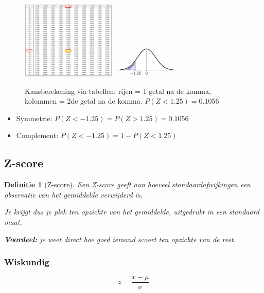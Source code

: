\documentclass{article}
\newtheorem{theorem}{Definitie}[section]
\begin{document}
\begin{figure}[H]
    \centering
    \includegraphics[width=0.4\textwidth]{normaalverdeling-tabel.png}
    \includegraphics[width=0.3\textwidth]{normaalverdeling-tabel2.png}
    \caption{Kansberekening via tabellen: rijen = 1 getal na de komma, kolommen = 2de getal na de komma. $P(Z < 1.25) = 0.1056$}
\end{figure}

\begin{itemize}
    \item Symmetrie: $P(Z < -1.25) = P(Z > 1.25) = 0.1056$
    \item Complement: $P(Z < -1.25) = 1- P(Z < 1.25)$
\end{itemize}

\subsection{Z-score}

\begin{theorem}[Z-score]
    Een Z-score geeft aan hoeveel standaardafwijkingen een observatie van het gemiddelde verwijderd is.

    Je krijgt dus je plek ten opzichte van het gemiddelde, uitgedrukt in een
    standaard maat.

    \textbf{Voordeel:} je weet direct hoe goed iemand scoort ten opzichte van de
    rest.
\end{theorem}

\subsubsection{Wiskundig}

\begin{equation}
    z = \frac{x - \mu}{\sigma}
\end{equation}
\end{document}
